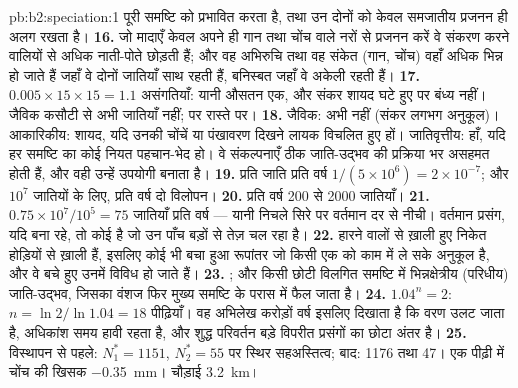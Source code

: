 \begin{solution}{pb:b2:speciation:1}
पूरी समष्टि को प्रभावित करता है, तथा उन दोनों को केवल समजातीय प्रजनन ही
अलग रखता है।
\textbf{16.} जो मादाएँ केवल अपने ही गान तथा चोंच वाले नरों से प्रजनन करें वे
संकरण करने वालियों से अधिक नाती-पोते छोड़ती हैं; और वह
अभिरुचि तथा वह संकेत (गान, चोंच) वहाँ अधिक भिन्न हो जाते हैं जहाँ वे
दोनों जातियाँ साथ रहती हैं, बनिस्बत जहाँ वे अकेली रहती हैं।
\textbf{17.} $0.005\times 15\times 15 = 1.1$ असंगतियाँ: यानी
औसतन एक, और संकर शायद घटे हुए पर बंध्य नहीं। जैविक कसौटी से अभी
जातियाँ नहीं; पर रास्ते पर।
\textbf{18.} जैविक: अभी नहीं (संकर लगभग अनुकूल)।
आकारिकीय: शायद, यदि उनकी चोंचें या पंखावरण दिखने लायक
विचलित हुए हों। जातिवृत्तीय: हाँ, यदि हर समष्टि का कोई नियत
पहचान-भेद हो। वे संकल्पनाएँ ठीक जाति-उद्भव की प्रक्रिया भर असहमत होती हैं,
और वही उन्हें उपयोगी बनाता है।
\textbf{19.} प्रति जाति प्रति वर्ष $1/(5\times 10^{6}) = 2\times 10^{-7}$;
और $10^{7}$ जातियों के लिए, प्रति वर्ष दो विलोपन।
\textbf{20.} प्रति वर्ष 200 से 2000 जातियाँ।
\textbf{21.} $0.75\times 10^{7}/10^{5} = 75$ जातियाँ प्रति वर्ष --- यानी
निचले सिरे पर वर्तमान दर से नीची। वर्तमान प्रसंग, यदि
बना रहे, तो कोई  है जो उन पाँच बड़ों से तेज़
चल रहा है।
\textbf{22.} हारने वालों से ख़ाली हुए निकेत होड़ियों से
ख़ाली हैं, इसलिए कोई भी बचा हुआ रूपांतर जो किसी एक को काम में ले सके अनुकूल है,
और वे बचे हुए उनमें विविध हो जाते हैं।
\textbf{23.} ; और किसी छोटी विलगित समष्टि में
भिन्नक्षेत्रीय (परिधीय) जाति-उद्भव, जिसका वंशज फिर
मुख्य समष्टि के परास में फैल जाता है।
\textbf{24.} $1.04^{n} = 2$: $n = \ln 2/\ln 1.04 = 18$ पीढ़ियाँ।
वह अभिलेख करोड़ों वर्ष इसलिए दिखाता है कि वरण उलट जाता है,
 अधिकांश समय हावी रहता है, और शुद्ध परिवर्तन
बड़े विपरीत प्रसंगों का छोटा अंतर है।
\textbf{25.} विस्थापन से पहले: $N_1^{*} =
1151$, $N_2^{*} = 55$ पर स्थिर सहअस्तित्व; बाद: 1176 तथा 47। एक पीढ़ी में चोंच की खिसक
\qty{-0.35}{mm}।  चौड़ाई \qty{3.2}{km}।
\end{solution}
